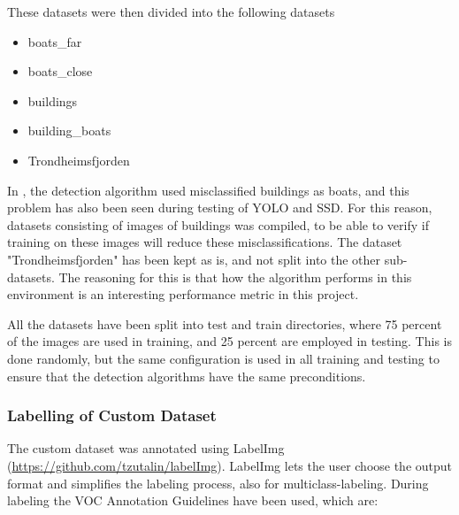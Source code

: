 \newpage

These datasets were then divided into the following datasets

\begin{itemize}
    \item boats\_far
    \item boats\_close
    \item buildings
    \item building\_boats
    \item Trondheimsfjorden
\end{itemize}

In \citep{Tangstad2017}, the detection algorithm used misclassified buildings as boats, and this problem has also been seen during testing of YOLO and SSD. For this reason, datasets consisting of images of buildings was compiled, to be able to verify if training on these images will reduce these misclassifications. The dataset "Trondheimsfjorden" has been kept as is, and not split into the other sub-datasets. The reasoning for this is that how the algorithm performs in this environment is an interesting performance metric in this project. 

\vspace{3mm}

All the datasets have been split into test and train directories, where 75 percent of the images are used in training, and 25 percent are employed in testing. This is done randomly, but the same configuration is used in all training and testing to ensure that the detection algorithms have the same preconditions.

\subsubsection{Labelling of Custom Dataset}
The custom dataset was annotated using LabelImg (\url{https://github.com/tzutalin/labelImg}). LabelImg lets the user choose the output format and simplifies the labeling process, also for multiclass-labeling. During labeling the VOC Annotation Guidelines \citep{Everingham2012} have been used, which are:

